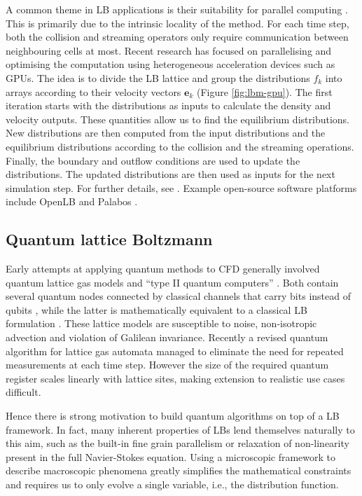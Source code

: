 \documentclass[10pt]{iopart}
\begin{document}
A common theme in LB applications is their suitability for parallel computing \cite{Alowayyed2017,Succi2019}. This is primarily due to the intrinsic locality of the method. For each time step, both the collision and streaming operators only require communication between neighbouring cells at most. Recent research has focused on parallelising and optimising the computation using heterogeneous acceleration devices such as GPUs. The idea is to divide the LB lattice and group the distributions $f_k$ into arrays according to their velocity vectors $\mathbf{e}_k$ (Figure \ref{fig:lbm-gpu}). The first iteration starts with the distributions as inputs to calculate the density and velocity outputs. These quantities allow us to find the equilibrium distributions. New distributions are then computed from the input distributions and the equilibrium distributions according to the collision and the streaming operations. Finally, the boundary and outflow conditions are used to update the distributions. The updated distributions are then used as inputs for the next simulation step. For further details, see \cite{Wei2004}. Example open-source software platforms include OpenLB \cite{Krause2021} and Palabos \cite{Latt2021}.


\subsection{Quantum lattice Boltzmann}

Early attempts at applying quantum methods to CFD generally involved quantum lattice gas models \cite{yepez2001quantum} and ``type II quantum computers'' \cite{Berman2002}. Both contain several quantum nodes connected by classical channels that carry bits instead of qubits \cite{yepez2001type}, while the latter is mathematically equivalent to a classical LB formulation \cite{love2006type}. These lattice models are susceptible to noise, non-isotropic advection and violation of Galilean invariance. Recently a revised quantum algorithm for lattice gas automata \cite{chrit2023fully} managed to eliminate the need for repeated measurements at each time step. However the size of the required quantum register scales linearly with lattice sites, making extension to realistic use cases difficult.

Hence there is strong motivation to build quantum algorithms on top of a LB framework. In fact, many inherent properties of LBs lend themselves naturally to this aim, such as the built-in fine grain parallelism or relaxation of non-linearity present in the full Navier-Stokes equation. Using a microscopic framework to describe macroscopic phenomena greatly simplifies the mathematical constraints and requires us to only evolve a single variable, i.e., the distribution function. 
\end{document}
